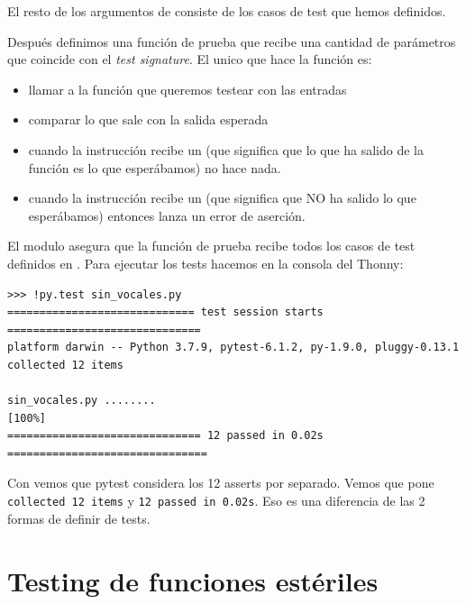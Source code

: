 El resto de los argumentos de  consiste de los casos de test que hemos definidos.

Después definimos una función de prueba  que recibe una cantidad de parámetros que coincide con el \emph{test signature}. El unico que hace la función es:

\begin{itemize}
    \item llamar a la función que queremos testear con las entradas 
    \item comparar lo que sale con la salida esperada 
    \item cuando la instrucción  recibe un  (que significa que lo que ha salido de la función es lo que esperábamos) no hace nada.
    \item cuando la instrucción  recibe un  (que significa que NO ha salido lo que esperábamos) entonces lanza un error de aserción.
\end{itemize}


El modulo  asegura que la función de prueba recibe todos los casos de test definidos en . Para ejecutar los tests hacemos en la consola del Thonny:


\begin{Verbatim}[frame=single]
>>> !py.test sin_vocales.py
============================= test session starts ==============================
platform darwin -- Python 3.7.9, pytest-6.1.2, py-1.9.0, pluggy-0.13.1
collected 12 items

sin_vocales.py ........                                                    [100%]
============================== 12 passed in 0.02s ===============================
\end{Verbatim}

Con  vemos que pytest considera los 12 asserts por separado. Vemos que pone \texttt{collected 12 items} y \texttt{12 passed in 0.02s}. Eso es una diferencia de las 2 formas de definir de tests.




\section{Testing de funciones estériles}

